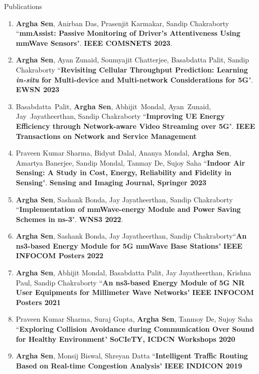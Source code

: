 \documentclass{resume} %
\begin{document}
\begin{rSection}{Publications}
\begin{enumerate}
			\item \textbf{Argha Sen}, Anirban Das, Prasenjit Karmakar, Sandip Chakraborty ``\textbf{mmAssist: Passive Monitoring of Driver's Attentiveness Using mmWave Sensors}". \textbf{IEEE COMSNETS 2023}.
			
			\item \textbf{Argha Sen}, Ayan Zunaid, Soumyajit Chatterjee, Basabdatta Palit, Sandip Chakraborty ``\textbf{Revisiting Cellular Throughput Prediction: Learning \textit{in-situ} for Multi-device and Multi-network Considerations for 5G}". \textbf{EWSN 2023}
			
			\item Basabdatta~Palit, \textbf{Argha Sen}, Abhijit~Mondal, Ayan~Zunaid, Jay~Jayatheerthan, Sandip Chakraborty ``\textbf{Improving UE Energy Efficiency through Network-aware Video Streaming over 5G}". \textbf{IEEE Transactions on Network and Service Management}
			\item Praveen Kumar Sharma, Bidyut Dalal, Ananya Mondal, \textbf{Argha Sen}, Amartya Banerjee, Sandip Mondal, Tanmay De, Sujoy Saha ``\textbf{Indoor Air Sensing: A Study in Cost, Energy, Reliability and Fidelity in Sensing}". \textbf{Sensing and Imaging Journal, Springer 2023}
			\item \textbf{Argha Sen}, Sashank Bonda, Jay Jayatheerthan, Sandip Chakraborty ``\textbf{Implementation of mmWave-energy Module and Power Saving Schemes in ns-3}". \textbf{WNS3 2022}.
			\item \textbf{Argha Sen}, Sashank Bonda, Jay Jayatheerthan, Sandip Chakraborty``\textbf{An ns3-based Energy Module for 5G mmWave Base Stations}" \textbf{IEEE INFOCOM Posters 2022}
			\item \textbf{Argha Sen}, Abhijit Mondal, Basabdatta Palit, Jay Jayatheerthan, Krishna Paul, Sandip Chakraborty ``\textbf{An ns3-based Energy Module of 5G NR User Equipments for Millimeter Wave Networks}" \textbf{IEEE INFOCOM Posters 2021}
			\item Praveen Kumar Sharma, Suraj Gupta, \textbf{Argha Sen}, Tanmoy De, Sujoy Saha ``\textbf{Exploring Collision Avoidance during Communication Over Sound for Healthy Environment}" \textbf{SoCIeTY, ICDCN Workshops 2020}
			\item \textbf{Argha Sen}, Monsij Biswal, Shreyan Datta ``\textbf{Intelligent Traffic Routing Based on Real-time Congestion Analysis}" \textbf{IEEE INDICON 2019}
			
		\end{enumerate}
	\end{rSection}
	
\end{document}
